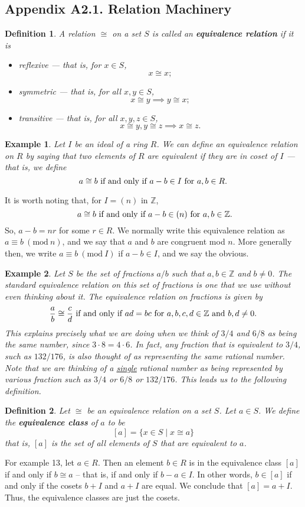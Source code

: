\documentclass[12pt,reqno]{amsart}
\theoremstyle{plain}
\newtheorem{defi}{Definition}
\newtheorem{ex}{Example}
\newcommand{\zz}{\mathbb Z}
\newcommand{\Mod}[1]{\ (\mathrm{mod}\ #1)}
\begin{document}
\subsection{Appendix A2.1. Relation Machinery}
\begin{defi} A relation $\cong$ on a set $S$ is called an \textbf{equivalence relation} if it is
\begin{itemize}
\item[\textup{1}.] reflexive — that is, for $x \in S$,
\[
x \cong x;
\]
\item[$2$.] symmetric — that is, for all $x, y \in S$, 
\[
x \cong y \implies y \cong x;
\]
\item[$3$.] transitive — that is, for all $x, y, z\in S$, 
\[
x \cong y, y \cong z \implies x \cong z.
\]
\end{itemize}
\end{defi} 
\begin{ex} Let $I$ be an ideal of a ring $R$. We can define an equivalence relation on $R$ by saying that two elements of $R$ are equivalent if they are in coset of $I$ — that is, we define
\[
\textup{$a \cong b$ if and only if $a-b \in I$ for $a, b \in R$.}
\]
\end{ex} 
It is worth noting that, for $I = (n)$ in $\zz$,  
\[
\textup{ $a \cong b$ if and only if $a-b \in (n)$ for $a, b \in \zz$.}
\]
So, $a-b=nr$ for some $r \in R$. We normally write this equivalence relation as $a \equiv b \Mod{n}$, and we say that $a$ and $b$ are congruent mod $n$. More generally then, we write $a \equiv b \Mod{I}$ if $a-b \in I$, and we say the obvious. 

\begin{ex}
Let $S$ be the set of fractions $a/b$ such that $a, b \in \zz$ and $b \neq 0$. The standard equivalence relation on this set of fractions is one that we use without even thinking about it. The equivalence relation on fractions is given by
\[
\textup{$\frac{a}{b} \cong \frac{c}{d}$ if and only if $ad = bc$ for $a, b, c, d \in \zz$ and $b,d \neq 0$.}
\]
This explains precisely what we are doing when we think of $3/4$ and $6/8$ as being the same number, since $3 \cdot 8 = 4 \cdot 6$. In fact, any fraction that is equivalent to $3/4$, such as $132/176$, is also thought of as representing the same rational number. Note that we are thinking of a \underline{single} rational number as being represented by various fraction such as $3/4$ or $6/8$ or $132/176$. This leads us to the following definition. 
\end{ex} 
\begin{defi} Let $\cong$ be an equivalence relation on a set $S$. Let $a \in S$. We define the \textbf{equivalence class} of $a$ to be 
\[
[a] = \{ x \in S \mid x \cong a \}
\]
that is, $[a]$ is the set of all elements of $S$ that are equivalent to $a$. 
\end{defi} 
For example 13, let $a \in R$. Then an element $b \in R$ is in the equivalence class $[a]$ if and only if $b \cong a$ – that is, if and only if $b-a \in I$. In other words, $b \in [a]$ if and only if the cosets $b+I$ and $a+I$ are equal. We conclude that $[a] = a+I$. Thus, the equivalence classes are just the cosets. 
\end{document}
